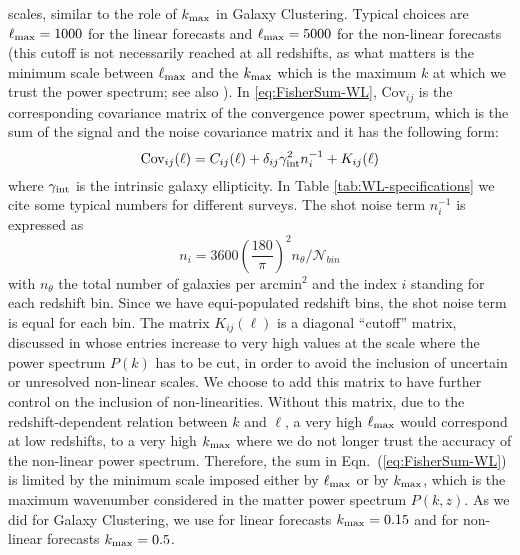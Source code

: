 scales, similar to the role of $k_{\rm max}$ in Galaxy Clustering. 
Typical choices are $\ell_{\mathrm{max}} = 1000$ for the linear forecasts and $\ell_{\mathrm{max}} = 5000$ for the
non-linear forecasts (this cutoff is not necessarily reached at all redshifts, 
as what matters is the minimum scale between $\ell_{\rm max}$ and the $k_{\rm max}$ which is
the maximum $k$ at which we trust the power spectrum; see also \cite{casas_fitting_2015}).
In \cref{eq:FisherSum-WL}, $\textrm{Cov}_{ij}$ is the corresponding covariance matrix of the 
convergence power spectrum, which is the sum of the signal and the noise covariance matrix and it has the following form:
\begin{equation}
\textrm{Cov}_{ij}(\ell)=C_{ij}(\ell)+\delta_{ij}\gamma_{\rm int}^{2}n_{i}^{-1}+K_{ij}(\ell)
\end{equation}
where $\gamma_{\rm int}$ is the intrinsic galaxy ellipticity. In Table \ref{tab:WL-specifications} we cite some typical numbers for different surveys.
The shot noise term $n_{i}^{-1}$ is expressed as
\begin{equation}
n_{i}=3600\left(\frac{180}{\pi}\right)^{2}n_{\theta}/\mathcal{N}_{bin}
\end{equation}
with $n_{\theta}$ the total number of galaxies per $\text{arcmin}^2$ and the index $i$ standing for each redshift bin.
Since we have equi-populated redshift bins, the shot noise term is equal for each bin.
The matrix $K_{ij}(\ell)$
is a diagonal ``cutoff'' matrix, discussed in \cite{casas_fitting_2015} whose entries increase to very high
values at the scale where the power spectrum $P(k)$ has to be cut, in order
to avoid the inclusion of uncertain or unresolved non-linear scales. We choose to add this matrix to have 
further control on the inclusion of non-linearities. Without this matrix, due to the redshift-dependent relation between
$k$ and $\ell$, a very high $\ell_{\mathrm{max}}$ would correspond at low redshifts, to a very high $k_{\rm max}$ where we do not longer
trust the accuracy of the non-linear power spectrum. Therefore, the sum in Eqn.\ (\ref{eq:FisherSum-WL}) is limited by the minimum scale imposed
either by $\ell_{\mathrm{max}}$ or by $k_{\rm max}$, which is the maximum wavenumber considered in the matter power spectrum $P(k,z)$. As we did for Galaxy Clustering, we use for linear forecasts $k_{\rm max}=0.15$ and for non-linear forecasts $k_{\rm max}=0.5$.



